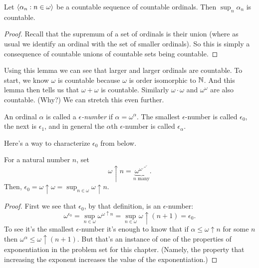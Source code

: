 \documentclass[10pt]{amsart}
\begin{document}
\begin{lemma}
Let ${\left\langle \alpha_n : n \in \omega \right\rangle}$ be a countable sequence of countable ordinals. Then $\sup_n \alpha_n$ is countable.
\end{lemma}

\begin{proof}
Recall that the supremum of a set of ordinals is their union (where as usual we identify an ordinal with the set of smaller ordinals). So this is simply a consequence of countable unions of countable sets being countable.
\end{proof}

Using this lemma we can see that larger and larger ordinals are countable. To start, we know $\omega$ is countable because $\omega$ is order isomorphic to $\mathbb{N}$. And this lemma then tells us that $\omega + \omega$ is countable. Similarly $\omega \cdot \omega$ and $\omega^\omega$ are also countable. (Why?) We can stretch this even further.

\begin{definition}
An ordinal $\alpha$ is called a \emph{$\epsilon$-number} if $\alpha = \omega^\alpha$. The smallest $\epsilon$-number is called $\epsilon_0$, the next is $\epsilon_1$, and in general the $\alpha$th $\epsilon$-number is called $\epsilon_\alpha$.
\end{definition}

Here's a way to characterize $\epsilon_0$ from below.

\begin{proposition}
For a natural number $n$, set 
\[
\omega \uparrow n = \underbrace{\omega^{\omega^{\iddots^{\omega^\omega}}}}_{n \text{ many}}.
\]
Then, $\epsilon_0 = \omega \uparrow \omega = \sup_{n \in \omega} \omega \uparrow n$.
\end{proposition}

\begin{proof}
First we see that $\epsilon_0$, by that definition, is an $\epsilon$-number:
\[
\omega^{\epsilon_0} = \sup_{n \in \omega} \omega^{\omega \uparrow n} = \sup_{n \in \omega} \omega \uparrow (n+1) = \epsilon_0.
\]
To see it's the smallest $\epsilon$-number it's enough to know that if $\alpha \le \omega \uparrow n$ for some $n$ then $\omega^\alpha \le \omega \uparrow (n+1)$. But that's an instance of one of the properties of exponentiation in the problem set for this chapter. (Namely, the property that increasing the exponent increases the value of the exponentiation.)
\end{proof}
\end{document}

